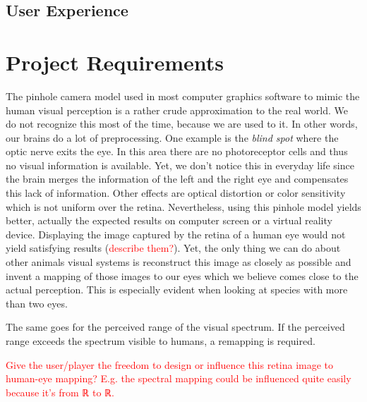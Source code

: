 \documentclass{acm_proc_article-sp}
\newcommand{\todo}[1]{\textcolor{Red}{#1}}
\begin{document}
\subsection{User Experience}

\section{Project Requirements}
The pinhole camera model used in most computer graphics software to mimic
the human visual perception is a rather crude approximation to the real world.
We do not recognize this most of the time, because we are used to it. In other
words, our brains do a lot of preprocessing.
One example is the \emph{blind spot} where the optic nerve exits the eye.
In this area there are no photoreceptor cells and thus no visual information is
available. Yet, we don't notice this in everyday life since the brain merges
the information of the left and the right eye and compensates this lack of
information. Other effects are optical distortion or color sensitivity which
is not uniform over the retina.
Nevertheless, using this pinhole model yields better, actually the expected
results on computer screen or a virtual reality device. Displaying the image
captured by the retina of a human eye would not yield satisfying results
(\todo{describe them?}).
Yet, the only thing we can do about other animals visual systems is reconstruct
this image as closely as possible and invent a mapping of those images to our
eyes which we believe comes close to the actual perception.
This is especially evident when looking at species with more than two eyes.

The same goes for the perceived range of the visual spectrum. If the perceived
range exceeds the spectrum visible to humans, a remapping is required.

\todo{Give the user/player the freedom to design or influence this retina image
to human-eye mapping? E.g. the spectral mapping could be influenced quite easily
because it's from ℝ to ℝ.}
\end{document}
